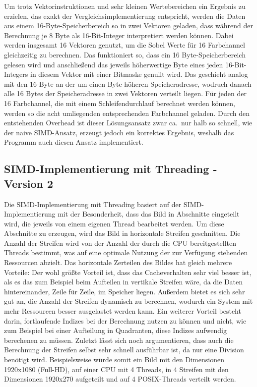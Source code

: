 \documentclass[course=erap]{aspdoc}
\begin{document}
Um trotz Vektorinstruktionen und sehr kleinen Wertebereichen ein Ergebnis zu erzielen,
das exakt der Vergleichsimplementierung entspricht, werden die Daten aus einem 16-Byte-Speicherbereich so in zwei Vektoren geladen, dass während der Berechnung je 8 Byte
als 16-Bit-Integer interpretiert werden können.
Dabei werden insgesamt 16 Vektoren genutzt, um die Sobel Werte für 16 Farbchannel gleichzeitig zu berechnen.
Das funktioniert so, dass ein 16 Byte-Speicherbereich gelesen wird und anschließend das jeweils höherwertige Byte eines jeden
16-Bit-Integers in diesem Vektor mit einer Bitmaske genullt wird.
Das geschieht analog mit den 16-Byte an der um einen Byte höheren Speicheradresse, wodruch danach alle 16 Bytes der Speicheradresse in zwei Vektoren verteilt liegen.
Für jeden der 16 Farbchannel, die mit einem Schleifendurchlauf berechnet werden können, werden so die acht umliegenden entsprechenden Farbchannel geladen.
Durch den entstehenden Overhead ist dieser Lösungsansatz zwar ca.\ nur halb so schnell, wie der naive SIMD-Ansatz, erzeugt jedoch ein korrektes Ergebnis, weshalb das Programm auch diesen Ansatz implementiert.

\subsection{SIMD-Implementierung mit Threading - Version 2}
\label{subsec:simd-threading}
Die SIMD-Implementierung mit Threading basiert auf der SIMD-Implementierung mit der Besonderheit, dass das Bild in Abschnitte eingeteilt wird, die jeweils von einem eigenen Thread bearbeitet werden.
Um diese Abschnitte zu erzeugen, wird das Bild in horizontale Streifen geschnitten.
Die Anzahl der Streifen wird von der Anzahl der durch die CPU bereitgestellten Threads bestimmt, was auf eine optimale Nutzung der zur Verfügung stehenden Ressourcen abzielt.
Das horizontale Zerteilen des Bildes hat gleich mehrere Vorteile:
Der wohl größte Vorteil ist, dass das Cacheverhalten sehr viel besser ist, als es das zum Beispiel beim Aufteilen in vertikale Streifen wäre, da die Daten hintereinander, Zeile für Zeile, im Speicher liegen.
Außerdem bietet es sich sehr gut an, die Anzahl der Streifen dynamisch zu berechnen, wodurch ein System mit mehr Ressourcen besser ausgelastet werden kann.
Ein weiterer Vorteil besteht darin, fortlaufende Indizes bei der Berechnung nutzen zu können und nicht, wie zum Beispiel bei einer Aufteilung in Quadranten, diese Indizes aufwendig berechenen zu müssen.
Zuletzt lässt sich noch argumentieren, dass auch die Berechnung der Streifen selbst sehr schnell ausführbar ist, da nur eine Division benötigt wird.
Beispielsweise würde somit ein Bild mit den Dimensionen 1920x1080 (Full-HD), auf einer CPU mit 4 Threads, in 4 Streifen mit den Dimensionen 1920x270 aufgeteilt und auf 4 POSIX-Threads verteilt werden.
\end{document}
